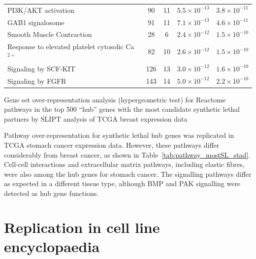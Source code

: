 \begin{table}[!ht]
{\begin{threeparttable}
\begin{tabular}{lcccc}
  \rowcolor{black!10}
  PI3K/AKT activation &  90 &  11 & $5.5 \times 10^{-13}$ & $3.8 \times 10^{-11}$ \\ 
  \rowcolor{black!5}
  GAB1 signalosome &  91 &  11 & $7.1 \times 10^{-13}$ & $4.6 \times 10^{-11}$ \\ 
  \rowcolor{black!10}
  Smooth Muscle Contraction &  28 &   6 & $2.4 \times 10^{-12}$ & $1.5 \times 10^{-10}$ \\ 
  \rowcolor{black!5}
  Response to elevated platelet cytosolic Ca$^{2+}$ &  82 &  10 & $2.6 \times 10^{-12}$ & $1.5 \times 10^{-10}$ \\ 
  \rowcolor{black!10}
  Signaling by SCF-KIT & 126 &  13 & $3.0 \times 10^{-12}$ & $1.6 \times 10^{-10}$ \\ 
  \rowcolor{black!5}
  Signaling by FGFR & 143 &  14 & $5.0 \times 10^{-12}$ & $2.2 \times 10^{-10}$ \\ 
   \hline
\end{tabular}
\begin{tablenotes}
\raggedright \small
Gene set over-representation analysis (hypergeometric test) for Reactome pathways in the top 500 ``hub'' genes with the most candidate synthetic lethal partners by SLIPT analysis of TCGA breast expression data
\end{tablenotes}
\end{threeparttable}
}
\end{table}

Pathway over-representation for synthetic lethal hub genes was replicated in TCGA stomach cancer expression data. However, these pathways differ considerably from breast cancer, as shown in Table~\ref{tab:pathway_mostSL_stad}. Cell-cell interactions and extracellular matrix pathways, including elastic fibres, were also among the hub genes for stomach cancer. The signalling pathways differ as expected in a different tissue type, although BMP and PAK signalling were detected as hub gene functions.

\FloatBarrier

\section{Replication in cell line encyclopaedia} \label{chapt3:CCLE}

\FloatBarrier

